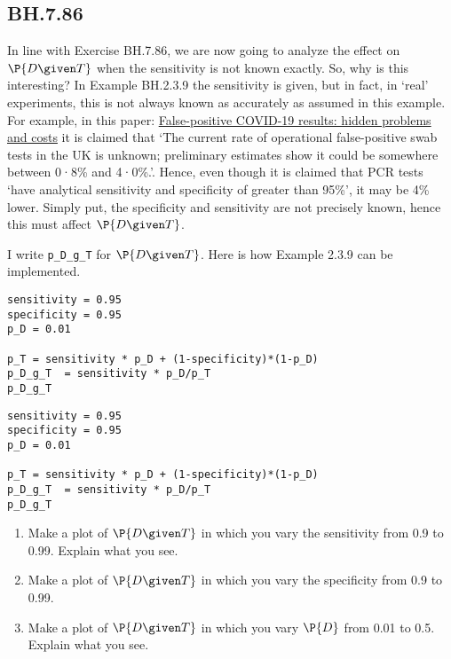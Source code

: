\subsection{BH.7.86}

In line with Exercise BH.7.86, we are now going to analyze the effect on \(\P{D\given T}\) when the sensitivity is not known exactly.
So, why is this interesting?
In Example BH.2.3.9 the sensitivity is given, but in fact, in `real' experiments, this is not always known as accurately as assumed in this example.
For example, in this paper: \href{https://www.thelancet.com/journals/lanres/article/PIIS2213-2600(20)30453-7/fulltext}{False-positive COVID-19 results: hidden problems and costs} it is claimed that `The current rate of operational false-positive swab tests in the UK is unknown; preliminary estimates show it could be somewhere between 0·8\% and 4·0\%.'.
Hence, even though it is claimed that PCR tests `have analytical sensitivity and specificity of greater than 95\%', it may be 4\% lower.
Simply put, the specificity and sensitivity are not precisely known, hence this must affect \(\P{D\given T}\).





I write \texttt{p\_D\_g\_T} for \(\P{D\given T}\). Here is how  Example 2.3.9 can be implemented.

\begin{verbatim}
sensitivity = 0.95
specificity = 0.95
p_D = 0.01

p_T = sensitivity * p_D + (1-specificity)*(1-p_D)
p_D_g_T  = sensitivity * p_D/p_T
p_D_g_T
\end{verbatim}

\begin{verbatim}
sensitivity = 0.95
specificity = 0.95
p_D = 0.01

p_T = sensitivity * p_D + (1-specificity)*(1-p_D)
p_D_g_T  = sensitivity * p_D/p_T
p_D_g_T
\end{verbatim}


\begin{exercise}
\begin{enumerate}
\item Make a plot of \(\P{D\given T}\) in which you vary the sensitivity from 0.9 to 0.99. Explain what you see.
\item Make a plot of \(\P{D\given T}\) in which you vary the specificity from 0.9 to 0.99.
\item Make a plot of \(\P{D\given T}\) in which you vary \(\P{D}\) from 0.01 to 0.5. Explain what you see.
\end{enumerate}
\end{exercise}
